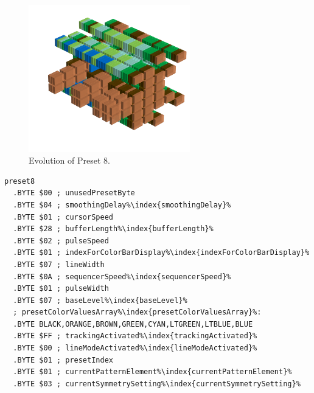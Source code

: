 \begin{minipage}[b]{0.48\linewidth}
\begin{figure}[H]                                                          
  \centering                                                             
  \begin{adjustbox}{width=7cm,center}                                   
  \includegraphics[width=7cm]{src/presets/pattern8-45.png}%
  \end{adjustbox}                                                        
\caption{Evolution of Preset 8.}                                           
\end{figure}                                                               
                                                                 
                                                                           
\end{minipage}
\hspace{0.1cm}
\begin{minipage}[b]{0.48\linewidth}                                       
\begin{lstlisting}[basicstyle=\ttfamily\scriptsize,caption=Data structure for Preset 8.,escapechar=\%]
preset8
  .BYTE $00 ; unusedPresetByte
  .BYTE $04 ; smoothingDelay%\index{smoothingDelay}%
  .BYTE $01 ; cursorSpeed
  .BYTE $28 ; bufferLength%\index{bufferLength}%
  .BYTE $02 ; pulseSpeed
  .BYTE $01 ; indexForColorBarDisplay%\index{indexForColorBarDisplay}%
  .BYTE $07 ; lineWidth
  .BYTE $0A ; sequencerSpeed%\index{sequencerSpeed}%
  .BYTE $01 ; pulseWidth
  .BYTE $07 ; baseLevel%\index{baseLevel}%
  ; presetColorValuesArray%\index{presetColorValuesArray}%: 
  .BYTE BLACK,ORANGE,BROWN,GREEN,CYAN,LTGREEN,LTBLUE,BLUE
  .BYTE $FF ; trackingActivated%\index{trackingActivated}%
  .BYTE $00 ; lineModeActivated%\index{lineModeActivated}%
  .BYTE $01 ; presetIndex
  .BYTE $01 ; currentPatternElement%\index{currentPatternElement}%
  .BYTE $03 ; currentSymmetrySetting%\index{currentSymmetrySetting}%
\end{lstlisting}
\end{minipage}


